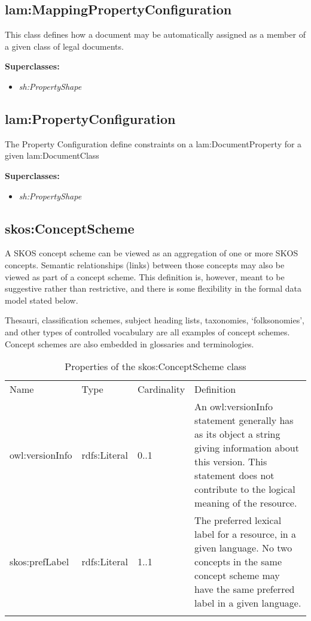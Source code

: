 \subsection{lam:MappingPropertyConfiguration}

This class defines how a document may be automatically assigned as a
member of a given class of legal documents.

\textbf{Superclasses:}

\begin{itemize}
\itemsep1pt\parskip0pt
\item
  \emph{sh:PropertyShape}
\end{itemize}

\subsection{lam:PropertyConfiguration}

The Property Configuration define constraints on a lam:DocumentProperty
for a given lam:DocumentClass

\textbf{Superclasses:}

\begin{itemize}
\itemsep1pt\parskip0pt
\item
  \emph{sh:PropertyShape}
\end{itemize}

\subsection{skos:ConceptScheme}

A SKOS concept scheme can be viewed as an aggregation of one or more
SKOS concepts. Semantic relationships (links) between those concepts may
also be viewed as part of a concept scheme. This definition is, however,
meant to be suggestive rather than restrictive, and there is some
flexibility in the formal data model stated below.

Thesauri, classification schemes, subject heading lists, taxonomies,
`folksonomies', and other types of controlled vocabulary are all
examples of concept schemes. Concept schemes are also embedded in
glossaries and terminologies.

{
	\footnotesize
	\selectfont%
	\begin{longtable}[c]{@{}p{3cm}p{2cm}p{2cm}p{7.8cm}@{}}
		\toprule\addlinespace
		Name & Type & Cardinality & Definition
		\\\addlinespace
		\midrule\endhead
		owl:versionInfo & rdfs:Literal & 0..1 & An owl:versionInfo statement
		generally has as its object a string giving information about this
		version. This statement does not contribute to the logical meaning of
		the resource.
		\\\addlinespace
		skos:prefLabel & rdfs:Literal & 1..1 & The preferred lexical label for a
		resource, in a given language. No two concepts in the same concept
		scheme may have the same preferred label in a given language.
		\\\addlinespace
		\bottomrule
		\addlinespace
		\caption{Properties of the skos:ConceptScheme class}
	\end{longtable}
}

